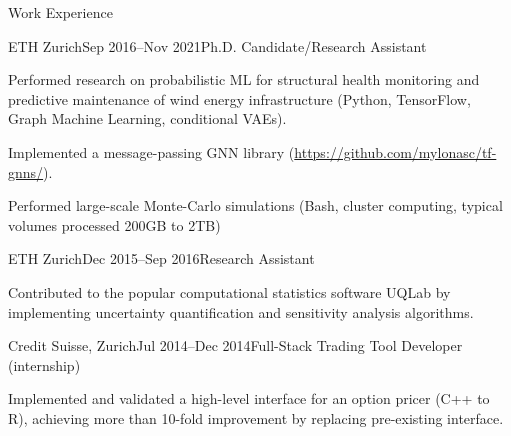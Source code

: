 \documentclass{resume_v2} %
\begin{document}
\begin{rSection}{Work Experience}
  \begin{myrSubsection}{ETH Zurich}{Sep 2016--Nov 2021}{Ph.D. Candidate/Research Assistant}
    \item Performed research on probabilistic ML for structural health monitoring and predictive maintenance of wind energy infrastructure (Python, TensorFlow, Graph Machine Learning, conditional VAEs).
    \item Implemented a message-passing GNN library (\url{https://github.com/mylonasc/tf-gnns/}).
    \item Performed large-scale Monte-Carlo simulations (Bash, cluster computing, typical volumes processed 200GB to 2TB)
  \end{myrSubsection}

  \begin{myrSubsection}{ETH Zurich}{Dec 2015--Sep 2016}{Research Assistant}
    \item Contributed to the popular computational statistics software UQLab by implementing uncertainty quantification and sensitivity analysis algorithms.
  \end{myrSubsection}

  \begin{myrSubsection}{Credit Suisse, Zurich}{Jul 2014--Dec 2014}{Full-Stack Trading Tool Developer (internship)}
    \item Implemented and validated a high-level interface for an option pricer (C++ to R), achieving more than 10-fold improvement by replacing pre-existing interface.
  \end{myrSubsection}

\end{rSection}

\newpage
\end{document}
